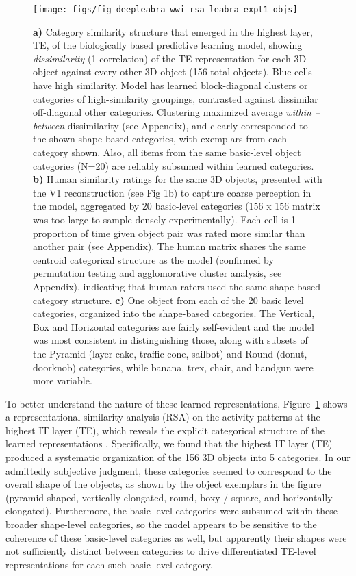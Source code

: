 \documentclass[11pt,twoside]{article}
\newif\myifpdf
\begin{document}
\begin{figure}
  \centering\texttt{[image: figs/fig\_deepleabra\_wwi\_rsa\_leabra\_expt1\_objs]}
  \caption{\footnotesize {\bf a)} Category similarity structure that emerged in the highest layer, TE, of the biologically based predictive learning model, showing \emph{dissimilarity} (1-correlation) of the TE representation for each 3D object against every other 3D object (156 total objects).  Blue cells have high similarity.  Model has learned block-diagonal clusters or categories of high-similarity groupings, contrasted against dissimilar off-diagonal other categories.  Clustering maximized average \emph{within -- between} dissimilarity (see Appendix), and clearly corresponded to the shown shape-based categories, with exemplars from each category shown.  Also, all items from the same basic-level object categories (N=20) are reliably subsumed within learned categories. {\bf b)} Human similarity ratings for the same 3D objects, presented with the V1 reconstruction (see Fig 1b) to capture coarse perception in the model, aggregated by 20 basic-level categories (156 x 156 matrix was too large to sample densely experimentally).  Each cell is 1 - proportion of time given object pair was rated more similar than another pair (see Appendix).  The human matrix shares the same centroid categorical structure as the model (confirmed by permutation testing and agglomorative cluster analysis, see Appendix), indicating that human raters used the same shape-based category structure. {\bf c)} One object from each of the 20 basic level categories, organized into the shape-based categories.  The Vertical, Box and Horizontal categories are fairly self-evident and the model was most consistent in distinguishing those, along with subsets of the Pyramid (layer-cake, traffic-cone, sailbot) and Round (donut, doorknob) categories, while banana, trex, chair, and handgun were more variable.}
  \label{fig.rsa}
\end{figure}

To better understand the nature of these learned representations, Figure~\ref{fig.rsa} shows a representational similarity analysis (RSA) on the activity patterns at the highest IT layer (TE), which reveals the explicit categorical structure of the learned representations \citep{KriegeskorteMurBandettini08,CadieuHongYaminsEtAl14}.  Specifically, we found that the highest IT layer (TE) produced a systematic organization of the 156 3D objects into 5 categories.  In our admittedly subjective judgment, these categories seemed to correspond to the overall shape of the objects, as shown by the object exemplars in the figure (pyramid-shaped, vertically-elongated, round, boxy / square, and horizontally-elongated).  Furthermore, the basic-level categories were subsumed within these broader shape-level categories, so the model appears to be sensitive to the coherence of these basic-level categories as well, but apparently their shapes were not sufficiently distinct between categories to drive differentiated TE-level representations for each such basic-level category.
\end{document}
